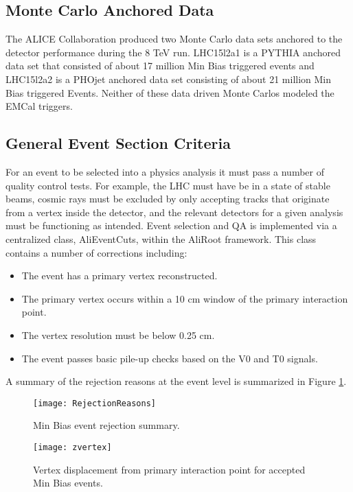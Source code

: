 \subsection{Monte Carlo Anchored Data}
The ALICE Collaboration produced two Monte Carlo data sets anchored to the detector performance during the 8 TeV run.  LHC15l2a1 is a PYTHIA anchored data set that consisted of about 17 million Min Bias triggered events and LHC15l2a2 is a PHOjet anchored data set consisting of about 21 million Min Bias triggered Events.  Neither of these data driven Monte Carlos modeled the EMCal triggers.

\subsection{General Event Section Criteria}
For an event to be selected into a physics analysis it must pass a number of quality control tests.  For example, the LHC must have be in a state of stable beams, cosmic rays must be excluded by only accepting tracks that originate from a vertex inside the detector, and the relevant detectors for a given analysis must be functioning as intended.  Event selection and QA is implemented via a centralized class, AliEventCuts, within the AliRoot framework.  This class contains a number of corrections including:

\begin{itemize}
  \item The event has a primary vertex reconstructed.
  \item The primary vertex occurs within a 10 cm window of the primary interaction point.
  \item The vertex resolution must be below 0.25 cm.
  \item The event passes basic pile-up checks based on the V0 and T0 signals.
\end{itemize}

\noindent
A summary of the rejection reasons at the event level is summarized in Figure \ref{fig:eventqa}.

\begin{figure}[h]
\texttt{[image: RejectionReasons]}
\centering
\caption{Min Bias event rejection summary.}
\label{fig:eventqa}
\end{figure}

\begin{figure}[h]
\texttt{[image: zvertex]}
\centering
\caption{Vertex displacement from primary interaction point for accepted Min Bias events.}
\label{fig:vertrec}
\end{figure}

